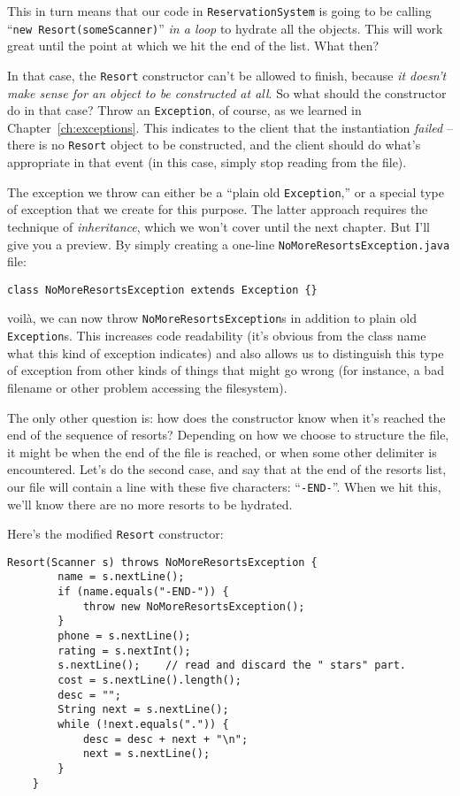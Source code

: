 This in turn means that our code in \texttt{ReservationSystem} is going to be
calling ``\texttt{new Resort(someScanner)}'' \textit{in a loop} to hydrate all
the objects. This will work great until the point at which we hit the end of
the list. What then?

In that case, the \texttt{Resort} constructor can't be allowed to finish,
because \textit{it doesn't make sense for an object to be constructed at all}.
So what should the constructor do in that case? Throw an \texttt{Exception},
of course, as we learned in Chapter~\ref{ch:exceptions}. This indicates to the
client that the instantiation \textit{failed} -- there is no \texttt{Resort}
object to be constructed, and the client should do what's appropriate in that
event (in this case, simply stop reading from the file).

The exception we throw can either be a ``plain old \texttt{Exception},'' or a
special type of exception that we create for this purpose. The latter approach
requires the technique of \textit{inheritance}, which we won't cover until the
next chapter. But I'll give you a preview. By simply creating a one-line
\texttt{NoMoreResortsException.java} file:

\begin{Verbatim}[fontsize=\small,samepage=true,frame=single]
class NoMoreResortsException extends Exception {}
\end{Verbatim}

voil\`{a}, we can now throw \texttt{NoMoreResortsException}s in addition to
plain old \texttt{Exception}s. This increases code readability (it's obvious
from the class name what this kind of exception indicates) and also allows us
to distinguish this type of exception from other kinds of things that might go
wrong (for instance, a bad filename or other problem accessing the
filesystem).

The only other question is: how does the constructor know when it's reached
the end of the sequence of resorts? Depending on how we choose to structure
the file, it might be when the end of the file is reached, or when some other
delimiter is encountered. Let's do the second case, and say that at the end of
the resorts list, our file will contain a line with these five characters:
``\texttt{-END-}''. When we hit this, we'll know there are no more resorts to be
hydrated.

Here's the modified \texttt{Resort} constructor:

\begin{Verbatim}[fontsize=\footnotesize,samepage=true,frame=single]
    Resort(Scanner s) throws NoMoreResortsException {
        name = s.nextLine();
        if (name.equals("-END-")) {
            throw new NoMoreResortsException();
        }
        phone = s.nextLine();
        rating = s.nextInt();
        s.nextLine();    // read and discard the " stars" part.
        cost = s.nextLine().length();
        desc = "";
        String next = s.nextLine();
        while (!next.equals(".")) {
            desc = desc + next + "\n";
            next = s.nextLine();
        }
    }
\end{Verbatim}

